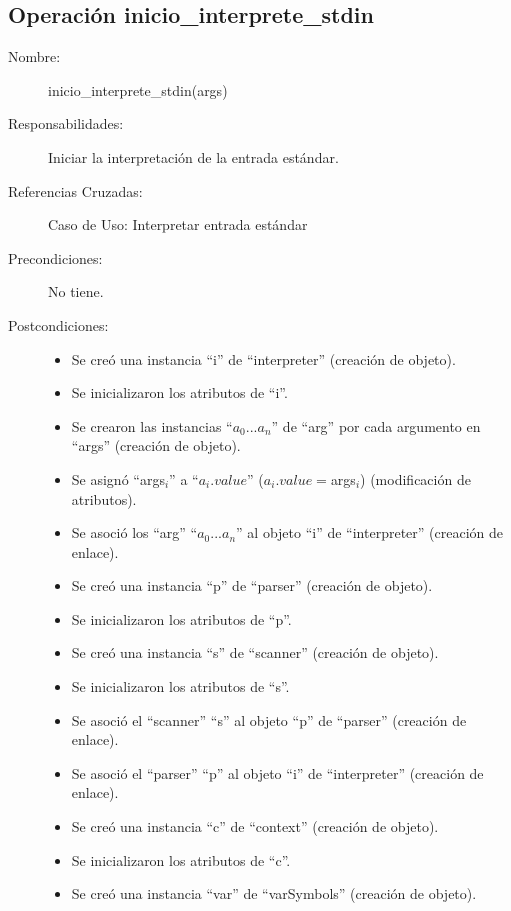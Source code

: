 \subsection{Operación inicio\_interprete\_stdin}
\FloatBarrier
\begin{framed}
	\begin{description}
		\item [Nombre:] inicio\_interprete\_stdin(args)
		\item [Responsabilidades:] Iniciar la interpretación de la entrada estándar.
		\item [Referencias Cruzadas: ] Caso de Uso: Interpretar entrada estándar
      \item [Precondiciones:] No tiene.
      \item [Postcondiciones:] \hfill
      \begin {itemize}
         \item Se creó una instancia ``i'' de ``interpreter'' (creación de objeto).
         \item Se inicializaron los atributos de ``i''.
         \item Se crearon las instancias ``$a_0...a_n$'' de ``arg'' por cada argumento en ``args'' (creación de objeto).
         \item Se asignó ``args$_i$'' a ``$a_i.value$'' ($a_i.value = $args$_i$) (modificación de atributos).
         \item Se asoció los ``arg'' ``$a_0...a_n$'' al objeto ``i'' de ``interpreter'' (creación de enlace).
         \item Se creó una instancia ``p'' de ``parser'' (creación de objeto).
         \item Se inicializaron los atributos de ``p''.
         \item Se creó una instancia ``s'' de ``scanner'' (creación de objeto).
         \item Se inicializaron los atributos de ``s''.
         \item Se asoció el ``scanner'' ``s'' al objeto ``p'' de ``parser'' (creación de enlace).
         \item Se asoció el ``parser'' ``p'' al objeto ``i'' de ``interpreter'' (creación de enlace).
         \item Se creó una instancia ``c'' de ``context'' (creación de objeto).
         \item Se inicializaron los atributos de ``c''.
         \item Se creó una instancia ``var'' de ``varSymbols'' (creación de objeto).

\end{itemize}
\end{description}
\end{framed}
